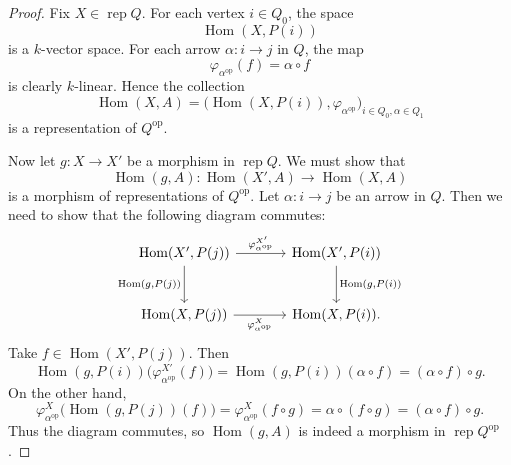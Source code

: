 \documentclass[11pt, a4paper]{report}
\begin{document}
            \begin{proof}
            Fix \(X\in \operatorname{rep}Q\). For each vertex \(i\in Q_0\), the space
            \[
            \operatorname{Hom}(X,P(i))
            \]
            is a \(k\)-vector space. For each arrow \(\alpha:i\to j\) in \(Q\), the map
            \[
            \varphi_{\alpha^{\operatorname{op}}}(f)=\alpha\circ f
            \]
            is clearly \(k\)-linear. Hence the collection
            \[
            \operatorname{Hom}(X,A)
            =
            \bigl(\operatorname{Hom}(X,P(i)),\varphi_{\alpha^{\operatorname{op}}}\bigr)_{i\in Q_0,\alpha\in Q_1}
            \]
            is a representation of \(Q^{\operatorname{op}}\).

            Now let \(g:X\to X'\) be a morphism in \(\operatorname{rep}Q\). We must show that
            \[
            \operatorname{Hom}(g,A):\operatorname{Hom}(X',A)\to \operatorname{Hom}(X,A)
            \]
            is a morphism of representations of \(Q^{\operatorname{op}}\). Let \(\alpha:i\to j\) be an arrow in \(Q\).
            Then we need to show that the following diagram commutes:
            \[
            \begin{tikzcd}[column sep=large, row sep=large]
            \operatorname{Hom}(X',P(j))
            \arrow[r, "\varphi^{X'}_{\alpha^{\operatorname{op}}}"]
            \arrow[d, "{\operatorname{Hom}(g,P(j))}"']
            &
            \operatorname{Hom}(X',P(i))
            \arrow[d, "{\operatorname{Hom}(g,P(i))}"]
            \\
            \operatorname{Hom}(X,P(j))
            \arrow[r, "\varphi^{X}_{\alpha^{\operatorname{op}}}"']
            &
            \operatorname{Hom}(X,P(i)).
            \end{tikzcd}
            \]
            Take \(f\in \operatorname{Hom}(X',P(j))\). Then
            \[
            \operatorname{Hom}(g,P(i))\bigl(\varphi^{X'}_{\alpha^{\operatorname{op}}}(f)\bigr)
            =
            \operatorname{Hom}(g,P(i))(\alpha\circ f)
            =
            (\alpha\circ f)\circ g.
            \]
            On the other hand,
            \[
            \varphi^{X}_{\alpha^{\operatorname{op}}}\bigl(\operatorname{Hom}(g,P(j))(f)\bigr)
            =
            \varphi^{X}_{\alpha^{\operatorname{op}}}(f\circ g)
            =
            \alpha\circ (f\circ g)
            =
            (\alpha\circ f)\circ g.
            \]
            Thus the diagram commutes, so \(\operatorname{Hom}(g,A)\) is indeed a morphism in
            \(\operatorname{rep}Q^{\operatorname{op}}\).


\end{proof}
\end{document}
